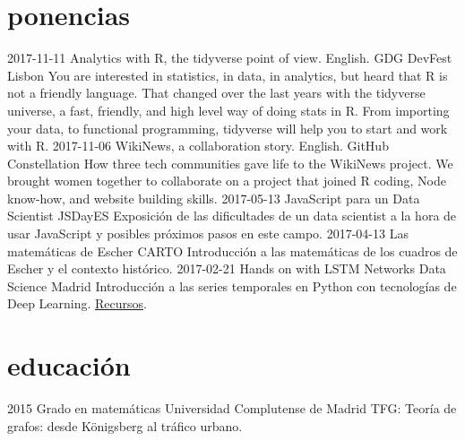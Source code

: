 \documentclass[]{friggeri-cv}
\begin{document}
\section{ponencias}

\begin{entrylist}
  \entry
    {2017-11-11}
    {Analytics with R, the tidyverse point of view. English.}
    {GDG DevFest Lisbon}
    {You are interested in statistics, in data, in analytics, but heard that R is not a friendly language. That changed over the last years with the tidyverse universe, a fast, friendly, and high level way of doing stats in R. From importing your data, to functional programming, tidyverse will help you to start and work with R.}
  \entry
    {2017-11-06}
    {WikiNews, a collaboration story. English.}
    {GitHub Constellation}
    {How three tech communities gave life to the WikiNews project. We brought women together to collaborate on a project that joined R coding, Node know-how, and website building skills.}
  \entry
    {2017-05-13}
    {JavaScript para un Data Scientist}
    {JSDayES}
    {Exposición de las dificultades de un data scientist a la hora de usar JavaScript y posibles próximos pasos en este campo.}
  \entry
    {2017-04-13}
    {Las matemáticas de Escher}
    {CARTO}
    {Introducción a las matemáticas de los cuadros de Escher y el contexto histórico.}
  \entry
    {2017-02-21}
    {Hands on with LSTM Networks}
    {Data Science Madrid}
    {Introducción a las series temporales en Python con tecnologías de Deep Learning. \href{https://github.com/chucheria/20170221_DSM-Workbook}{Recursos}.}
\end{entrylist}

\section{educación}

\begin{entrylist}
  \entry
    {2015}
    {Grado en matemáticas}
    {Universidad Complutense de Madrid}
    {TFG: Teoría de grafos: desde Königsberg al tráfico urbano.}
\end{entrylist}


\end{document}
